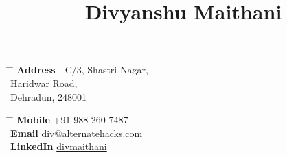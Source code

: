 \documentclass[10pt]{article} %
\begin{document}

\title{Divyanshu Maithani} %


\parbox{0.5\textwidth}{ %
\begin{tabbing} %
\hspace{3cm} \= \hspace{4cm} \= \kill %
{\bf Address}  - C/3, Shastri Nagar, \\
\> Haridwar Road,\\ %
\> Dehradun, 248001 \\ %
\end{tabbing}}
\hfill %
\parbox{0.5\textwidth}{ %
\begin{tabbing} %
\hspace{3cm} \= \hspace{4cm} \= \kill %
{\bf Mobile} \> +91 988 260 7487 \\ %
{\bf Email} \> \underline{\href{mailto:div@alternatehacks.com}{div@alternatehacks.com}} \\
{\bf LinkedIn} \> {\color{slateblue}\href{https://in.linkedin.com/in/divmaithani}{divmaithani}}%
\end{tabbing}}



\end{document}
